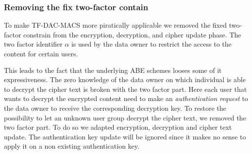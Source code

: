 \subsubsection{Removing the fix two-factor contain}
To make \ac{TF-DAC-MACS} more piratically applicable we removed the fixed two-factor constrain from the encryption, decryption, and cipher update phase. The two factor identifier $\alpha$ is used by the data owner to restrict the access to the content for certain users. 

This leads to the fact that the underlying \ac{ABE} schemes looses some of it expressiveness. The zero knowledge of the data owner on which individual is able to decrypt the cipher text is broken with the two factor part. Here each user that wants to decrypt the encrypted content need to make an \textit{authentication request} to the data owner to receive the corresponding decryption key. To restore the possibility to let an unknown user group decrypt the cipher text, we removed the two factor part. To do so we adapted encryption, decryption and cipher text update. The authentication key update will be ignored since it makes no sense to apply it on a non existing authentication key. 

